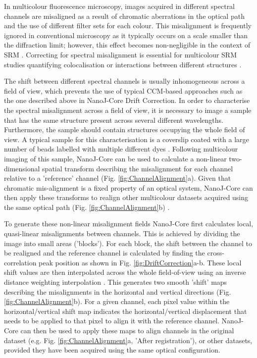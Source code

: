 In multicolour fluorescence microscopy, images acquired in different spectral channels are misaligned as a result of chromatic aberrations in the optical path and the use of different filter sets for each colour. This misalignment is frequently ignored in conventional microscopy as it typically occurs on a scale smaller than the diffraction limit; however, this effect becomes non-negligible in the context of SRM \cite{erdelyi2013correcting}. Correcting for spectral misalignment is essential for multicolour SRM studies quantifying colocalisation or interactions between different structures \cite{bock2007two,van2009multicolor,niekamp2017high}. 
 
 The shift between different spectral channels is usually inhomogeneous across a field of view, which prevents the use of typical CCM-based approaches such as the one described above in NanoJ-Core Drift Correction. In order to characterise the spectral misalignment across a field of view, it is necessary to image a sample that has the same structure present across several different wavelengths. Furthermore, the sample should contain structures occupying the whole field of view. A typical sample for this characterisation is a coverslip coated with a large number of beads labelled with multiple different dyes \cite{Demmerle2017}. Following multicolour imaging of this sample, NanoJ-Core can be used to calculate a non-linear two-dimensional spatial transform describing the misalignment for each channel relative to a 'reference' channel (Fig. \ref{fig:ChannelAlignment}a). Given that chromatic mis-alignment is a fixed property of an optical system, NanoJ-Core can then apply these transforms to realign other multicolour datasets acquired using the same optical path (Fig. \ref{fig:ChannelAlignment}b) \cite{arganda2006consistent,annibale2012identification}. 
 
 To generate these non-linear misalignment fields NanoJ-Core first calculates local, quasi-linear misalignments between channels. This is achieved by dividing the image into small areas ('blocks'). For each block, the shift between the channel to be realigned and the reference channel is calculated by finding the cross-correlation peak position as shown in Fig. \ref{fig:DriftCorrection}a-b. These local shift values are then  interpolated across the whole field-of-view using an inverse distance weighting interpolation \cite{shepard1968two}. This generates two smooth 'shift' maps describing the misalignments in the horizontal and vertical directions (Fig. \ref{fig:ChannelAlignment}b). For a given channel, each pixel value within the horizontal/vertical shift map indicates the horizontal/vertical displacement that needs to be applied to that pixel to align it with the reference channel. NanoJ-Core can then be used to apply these maps to align channels in the original dataset (e.g. Fig. \ref{fig:ChannelAlignment}a, 'After registration'), or other datasets, provided they have been acquired using the same optical configuration.
 
